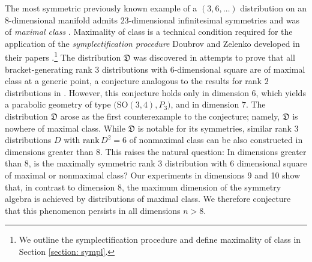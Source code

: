 \documentclass[11pt,letterpaper]{amsart}
\numberwithin{equation}{section}
\newcommand\alttext[1]{%
\useasboundingbox (current bounding box);
\draw let  \p1 = (current bounding box.south west),
        \p2 = (current bounding box.north east)
    in
  node at (current bounding box.center) 
     {\pdftooltip{\phantom{\rule{\dimexpr\x2-\x1\relax}{\dimexpr\y2-\y1\relax}}}%
                 {#1}};
}
\begin{document}
\begin{center}
{
}
\end{center}

The most symmetric previously known example of a $(3,6,\ldots)$ distribution on an $8$-dimensional manifold admits $23$-dimensional infinitesimal symmetries and was of \textit{maximal class} \cite{doubrov2025large}. Maximality of class is a technical condition required for the application of the \textit{symplectification procedure} Doubrov and Zelenko developed in their papers \cite{doubrov2008rank3} \cite{doubrov2016JacobiCurves}.\footnote{We outline the symplectification procedure and define maximality of class in Section \ref{section: sympl}.} The distribution $\mathfrak{D}$ was discovered in attempts to prove that all bracket-generating rank $3$ distributions with $6$-dimensional square are of maximal class at a generic point, a conjecture analogous to the results for rank $2$ distributions in \cite{day2025canonicalframes}. However, this conjecture holds only in dimension $6$, which yields a parabolic geometry of type $\big(\mathrm{SO}(3,4),P_{3}\big)$, and in dimension $7$. The distribution $\mathfrak{D}$ arose as the first counterexample to the conjecture; namely, $\mathfrak{D}$ is nowhere of maximal class. While $\mathfrak{D}$ is notable for its symmetries, similar rank $3$ distributions $D$ with $\mathrm{rank}\, D^2=6$  of nonmaximal class can be also constructed in dimensions greater than $8$. 
This raises the natural question: In dimensions greater than $8$, is the maximally symmetric rank $3$ distribution with $6$ dimensional square of maximal or nonmaximal class? Our experiments in dimensions 9 and 10 show that, in contrast to dimension 8, the maximum dimension of the symmetry algebra is achieved by distributions of maximal class. We therefore conjecture that this phenomenon persists in all dimensions $n > 8$.
\end{document}
